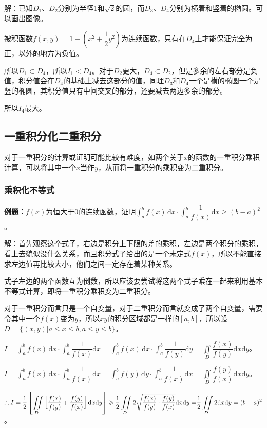 解：已知$D_1$、$D_2$分别为半径1和$\sqrt{2}$的圆，而$D_3$、$D_4$分别为横着和竖着的椭圆。可以画出图像。

被积函数$f(x,y)=1-\left(x^2+\dfrac{1}{2}y^2\right)$为连续函数，只有在$D_4$上才能保证完全为正，以外的地方为负值。

所以$D_1\subset D_4$，所以$I_1<D_4$。对于$D_2$更大，$D_4\subset D_2$，但是多余的左右部分是负值，积分值会在$D_4$的基础上减去这部分的值，同理$D_3$和$D_4$一个是横的椭圆一个是竖的椭圆，其积分值只有中间交叉的部分，还要减去两边多余的部分。

所以$I_4$最大。

\subsection{一重积分化二重积分}

对于一重积分的计算或证明可能比较有难度，如两个关于$x$的函数的一重积分乘积计算，可以将其中一个$x$当作$y$，从而将一重积分的乘积变为二重积分。

\subsubsection{乘积化不等式}

\textbf{例题：}$f(x)$为恒大于0的连续函数，证明$\displaystyle{\int_a^bf(x)\,\textrm{d}x\cdot\int_a^b\dfrac{1}{f(x)}\textrm{d}x\geqslant(b-a)^2}$。

解：首先观察这个式子，右边是积分上下限的差的乘积，左边是两个积分的乘积，看上去貌似没什么关系，而且积分式子给出的是一个未定式$f(x)$，所以不能直接求左边值再比较大小，他们之间一定存在着某种关系。

式子左边的两个函数互为倒数，所以应该要尝试将这两个式子乘在一起来利用基本不等式计算，即将一重积分乘积变为二重积分。

对于一重积分而言只是一个自变量，对于二重积分而言就变成了两个自变量，需要令其中一个$f(x)$变为$y$，所以$xy$的积分区域都是一样的$[a,b]$，所以设$D=\{(x,y)\vert a\leqslant x\leqslant b,a\leqslant y\leqslant b\}$。

$I=\displaystyle{\int_a^bf(x)\,\textrm{d}x\cdot\int_a^b\dfrac{1}{f(x)}\textrm{d}x}=\int_a^bf(x)\,\textrm{d}x\cdot\int_a^b\dfrac{1}{f(y)}\textrm{d}y=\iint\limits_D\dfrac{f(x)}{f(y)}\textrm{d}x\textrm{d}y$。

$I=\displaystyle{\int_a^bf(x)\,\textrm{d}x\cdot\int_a^b\dfrac{1}{f(x)}\textrm{d}x}=\int_a^bf(y)\,\textrm{d}y\cdot\int_a^b\dfrac{1}{f(x)}\textrm{d}x=\iint\limits_D\dfrac{f(y)}{f(x)}\textrm{d}x\textrm{d}y$。

$\therefore I=\displaystyle{\dfrac{1}{2}\left[\iint\limits_D\left[\dfrac{f(x)}{f(y)}+\dfrac{f(y)}{f(x)}\right]\textrm{d}x\textrm{d}y\right]\geqslant\dfrac{1}{2}\iint\limits_D2\sqrt{\dfrac{f(x)}{f(y)}\cdot\dfrac{f(y)}{f(x)}}\textrm{d}x\textrm{d}y=}\\\displaystyle{\dfrac{1}{2}\iint\limits_D2\textrm{d}x\textrm{d}y}=(b-a)^2$。

